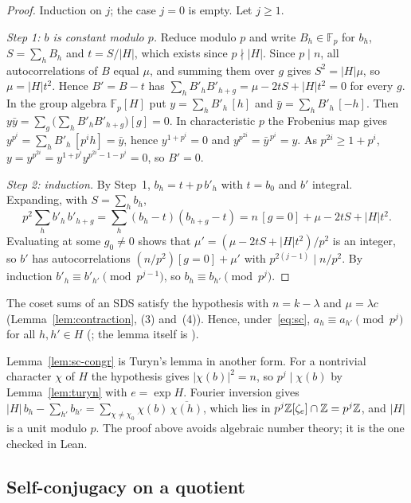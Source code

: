\begin{proof}
Induction on $j$; the case $j = 0$ is empty. Let $j \ge 1$.

\emph{Step 1: $b$ is constant modulo $p$.} Reduce modulo $p$ and write $B_h \in \mathbb{F}_p$
for $b_h$, $S = \sum_h B_h$ and $t = S/|H|$, which exists since $p \nmid |H|$. Since $p \mid n$,
all autocorrelations of $B$ equal $\mu$, and summing them over $g$ gives $S^2 = |H| \mu$, so
$\mu = |H| t^2$. Hence $B' = B - t$ has
$\sum_h B'_h B'_{h+g} = \mu - 2tS + |H| t^2 = 0$ for every $g$. In the group algebra
$\mathbb{F}_p[H]$ put $y = \sum_h B'_h\, [h]$ and $\bar y = \sum_h B'_h\, [-h]$. Then
$y \bar y = \sum_g \bigl(\sum_h B'_h B'_{h+g}\bigr) [g] = 0$. In characteristic $p$ the
Frobenius map gives $y^{p^i} = \sum_h B'_h\, [p^i h] = \bar y$, hence $y^{1+p^i} = 0$ and
$y^{p^{2i}} = \bar y^{\,p^i} = y$. As $p^{2i} \ge 1 + p^i$,
$y = y^{p^{2i}} = y^{1 + p^i} y^{p^{2i} - 1 - p^i} = 0$, so $B' = 0$.

\emph{Step 2: induction.} By Step~1, $b_h = t + p\, b'_h$ with $t = b_0$ and $b'$ integral.
Expanding, with $S = \sum_h b_h$,
\[
  p^2 \sum_h b'_h\, b'_{h+g} = \sum_h (b_h - t)(b_{h+g} - t) = n\,[g = 0] + \mu - 2tS + |H| t^2 .
\]
Evaluating at some $g_0 \neq 0$ shows that $\mu' = (\mu - 2tS + |H|t^2)/p^2$ is an integer, so
$b'$ has autocorrelations $(n/p^2)[g = 0] + \mu'$ with $p^{2(j-1)} \mid n/p^2$. By induction
$b'_h \equiv b'_{h'} \pmod{p^{j-1}}$, so $b_h \equiv b_{h'} \pmod{p^j}$.
\end{proof}

The coset sums of an SDS satisfy the hypothesis with $n = k - \lambda$ and $\mu = \lambda c$
(Lemma~\ref{lem:contraction}, (3) and~(4)). Hence, under~\eqref{eq:sc}, $a_h \equiv a_{h'}
\pmod{p^j}$ for all $h, h' \in H$ (; the
lemma itself is ).

\begin{remark}
Lemma~\ref{lem:sc-congr} is Turyn's lemma in another form. For a nontrivial character $\chi$ of
$H$ the hypothesis gives $|\chi(b)|^2 = n$, so $p^j \mid \chi(b)$ by Lemma~\ref{lem:turyn}
with $e = \exp H$. Fourier inversion gives
$|H|\, b_h - \sum_{h'} b_{h'} = \sum_{\chi \neq \chi_0} \chi(b)\, \overline{\chi(h)}$, which
lies in $p^j \mathbb{Z}[\zeta_e] \cap \mathbb{Z} = p^j \mathbb{Z}$, and $|H|$ is a unit modulo $p$. The proof above
avoids algebraic number theory; it is the one checked in Lean.
\end{remark}

\subsection{Self-conjugacy on a quotient}

